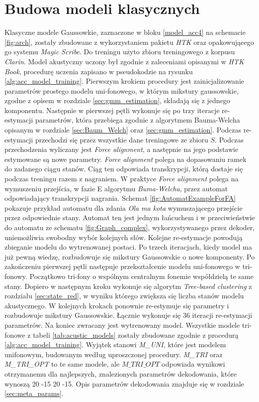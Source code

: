 \documentclass[shortabstract, mgr]{iithesis}
\newcommand{\refBlock}[1]{
	\hyperref[#1]{\ref*{#1}}
}
\begin{document}
	\section{Budowa modeli klasycznych}
		Klasyczne modele Gaussowkie, zaznaczone w bloku \refBlock{model_acc4} na schemacie \ref{fig:arch}, zostały zbudowane z wykorzystaniem pakietu \textit{HTK} oraz opakowującego go systemu \textit{Magic Scribe}. Do treningu użyto zbioru treningowego z korpusu \textit{Clarin}. Model akustyczny uczony był zgodnie z zaleceniami opisanymi w \textit{HTK Book}\cite{htkbook}, procedurę uczenia zapisano w pseudokodzie na rysunku \ref{alg:acc_model_training}. Pierwszym krokiem procedury jest zainicjalizowanie parametrów prostego modelu uni-fonowego, w którym mikstury gaussowskie, zgodne z opisem w rozdziale \ref{sec:gmm_estimation}, składają się z jednego komponentu. Następnie w pierwszej pętli wykonuje się po trzy iteracje re-estymacji parametrów, która przebiega zgodnie z algorytmem Bauma-Welcha opisanym w rozdziale \ref{sec:Baum_Welch} oraz \ref{sec:gmm_estimation}. Podczas re-estymacji przechodzi się przez wszystkie dane treningowe ze zbioru $S$. Podczas przechodzenia wyliczany jest \textit{Force alignment}, a następnie na jego podstawie estymowane są nowe parametry. \textit{Force alignment} polega na dopasowaniu ramek do zadanego ciągu stanów. Ciąg ten odpowiada transkrypcji, którą dostaje się podczas treningu razem z nagraniem. W praktyce \textit{Force alignment} polega na wymuszeniu przejścia, w fazie E algorytmu \textit{Buma-Welcha}, przez automat odpowiadający transkrypcji nagrania. Schemat \ref{fig:AutomatExampleForFA} pokazuje przykład automatu dla zdania \textit{Ola ma kota} wymuszającego przejście przez odpowiednie stany. Automat ten jest jednym łańcuchem i w przeciwieństwie do automatu ze schematu \ref{fig:Graph_complex}, wykorzystywanego przez dekoder, uniemożliwia swobodny wybór kolejnych słów. Kolejne re-estymacje powodują zbieganie modelu do wytrenowanej postaci. Po trzech iteracjach, kiedy model ma już pewną wiedzę, rozbudowuje się mikstury Gaussowskie o nowe komponenty. Po zakończeniu pierwszej pętli następuje przekształcenie modelu uni-fonowego w tri-fonowy. Początkowo tri-fony o wspólnym centralnym fonemie współdzielą te same stany. Dopiero w następnym kroku wykonuje się algorytm \textit{Tree-based clustering} z rozdziału \ref{sec:state_red}, w wyniku którego zwiększa się liczba stanów modelu akustycznego. W kolejnych krokach ponownie re-estymuje się parametry i rozbudowuje mikstury Gaussowskie. Łącznie wykonuje się $36$ iteracji re-estymacji parametrów. Na koniec zwracany jest wytrenowany model. Wszystkie modele tri-fonowe z tabeli \ref{tab:acustic_models} zostały zbudowane zgodnie z procedurą \ref{alg:acc_model_training}. Wyjątek stanowi \textit{M\_UNI}, które jest modelem unifonowym, budowanym według uproszczonej procedury. \textit{M\_TRI} oraz \textit{M\_TRI\_OPT} to te same modele, ale $M\_TRI\_OPT$ odpowiada wynikowi otrzymanemu dla najlepszych, znalezionych parametrów dekodowania, które wynoszą 20 -15 20 -15. Opis parametrów dekodowania znajduje się w rozdziale \ref{sec:meta_params}.
		
\end{document}
